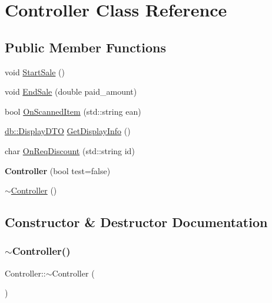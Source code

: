 \hypertarget{classController}{}\section{Controller Class Reference}
\label{classController}
\subsection*{Public Member Functions}
\begin{DoxyCompactItemize}
\item 
void \mbox{\hyperlink{classController_a0a9b1a04843990d5692b4af126b21efd}{Start\+Sale}} ()
\item 
void \mbox{\hyperlink{classController_a533d123d57b0aa61ee7e5e78dbd2ef27}{End\+Sale}} (double paid\+\_\+amount)
\item 
bool \mbox{\hyperlink{classController_a89f3bf717eacccece51eb0e18a4727e1}{On\+Scanned\+Item}} (std\+::string ean)
\item 
\mbox{\hyperlink{classdb_1_1DisplayDTO}{db\+::\+Display\+D\+TO}} \mbox{\hyperlink{classController_aed4cd2b11a4d29b7efa272b806fa0813}{Get\+Display\+Info}} ()
\item 
char \mbox{\hyperlink{classController_a72bf65a5fee35f140e4890d5dd3fd839}{On\+Req\+Discount}} (std\+::string id)
\item 
\mbox{\label{classController_a62380a8fe78d6e8d5bee5a4d57fb99c3}} 
{\bfseries Controller} (bool test=false)
\item 
\mbox{\hyperlink{classController_a0ab87934c4f7a266cfdb86e0f36bc1b5}{$\sim$\+Controller}} ()
\end{DoxyCompactItemize}


\subsection{Constructor \& Destructor Documentation}
\mbox{\label{classController_a0ab87934c4f7a266cfdb86e0f36bc1b5}} 
\subsubsection{\texorpdfstring{$\sim$\+Controller()}{~Controller()}}
{\footnotesize\ttfamily Controller\+::$\sim$\+Controller (\begin{DoxyParamCaption}{ }\end{DoxyParamCaption})\hspace{0.3cm}{\ttfamily [inline]}}

